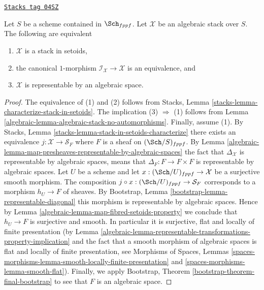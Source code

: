 \begin{proposition}
\label{algebraic-proposition-algebraic-stack-no-automorphisms}
\href{https://stacks.math.columbia.edu/tag/04SZ}{\texttt{Stacks tag 04SZ}}

Let $S$ be a scheme contained in $\Sch_{fppf}$.
Let $\mathcal{X}$ be an algebraic stack over $S$.
The following are equivalent
\begin{enumerate}
\item $\mathcal{X}$ is a stack in setoids,
\item the canonical $1$-morphism $\mathcal{I}_\mathcal{X} \to \mathcal{X}$
is an equivalence, and
\item $\mathcal{X}$ is representable by an algebraic space.
\end{enumerate}
\end{proposition}

\begin{proof}

The equivalence of (1) and (2) follows from
Stacks, Lemma \ref{stacks-lemma-characterize-stack-in-setoids}.
The implication (3) $\Rightarrow$ (1) follows from
Lemma \ref{algebraic-lemma-algebraic-stack-no-automorphisms}.
Finally, assume (1). By
Stacks, Lemma \ref{stacks-lemma-stack-in-setoids-characterize}
there exists an equivalence $j : \mathcal{X} \to \mathcal{S}_F$
where $F$ is a sheaf on $(\Sch/S)_{fppf}$.  By
Lemma \ref{algebraic-lemma-map-presheaves-representable-by-algebraic-spaces}
the fact that $\Delta_\mathcal{X}$ is representable by algebraic
spaces, means that $\Delta_F : F \to F \times F$
is representable by algebraic spaces.
Let $U$ be a scheme and let $x : (\Sch/U)_{fppf} \to \mathcal{X}$
be a surjective smooth morphism. The composition
$j \circ x : (\Sch/U)_{fppf} \to \mathcal{S}_F$
corresponds to a morphism $h_U \to F$ of sheaves. By
Bootstrap, Lemma \ref{bootstrap-lemma-representable-diagonal}
this morphism is representable by algebraic spaces.
Hence by
Lemma \ref{algebraic-lemma-map-fibred-setoids-property}
we conclude that $h_U \to F$ is surjective and smooth.
In particular it is surjective, flat and locally of finite presentation
(by
Lemma \ref{algebraic-lemma-representable-transformations-property-implication}
and the fact that a smooth morphism of algebraic spaces is flat and
locally of finite presentation, see
Morphisms of Spaces,
Lemmas \ref{spaces-morphisms-lemma-smooth-locally-finite-presentation} and
\ref{spaces-morphisms-lemma-smooth-flat}).
Finally, we apply
Bootstrap, Theorem \ref{bootstrap-theorem-final-bootstrap}
to see that $F$ is an algebraic space.
\end{proof}

